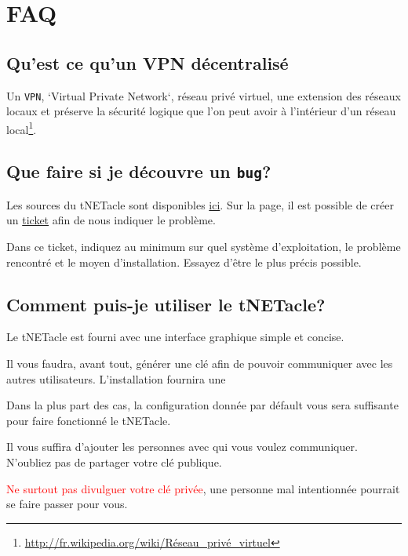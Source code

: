 ﻿\section{FAQ}
\subsection{Qu'est ce qu'un VPN décentralisé}
Un \texttt{VPN}, `Virtual Private Network`, réseau privé virtuel,
une extension des réseaux locaux et préserve la sécurité logique que
l'on peut avoir à l'intérieur d'un réseau local\footnote{\url{http://fr.wikipedia.org/wiki/Réseau\_privé\_virtuel}}.

\subsection{Que faire si je découvre un \texttt{bug}?}

Les sources du tNETacle sont disponibles \href{https://github.com/LaKabane/tNETacle}{ici}.
Sur la page, il est possible de créer un \href{https://github.com/LaKabane/tNETacle/issues/new}{ticket}
afin de nous indiquer le problème.

Dans ce ticket, indiquez au minimum sur quel système d'exploitation, le problème rencontré et le moyen d'installation.
Essayez d'être le plus précis possible.

\subsection{Comment puis-je utiliser le tNETacle?}
Le tNETacle est fourni avec une interface graphique simple et concise.

Il vous faudra, avant tout, générer une clé afin de pouvoir communiquer avec les autres utilisateurs.
L'installation fournira une 

Dans la plus part des cas,
la configuration donnée par défault vous sera suffisante pour faire fonctionné le tNETacle.

Il vous suffira d'ajouter les personnes avec qui vous voulez communiquer. N'oubliez pas de partager votre clé publique.

\textcolor{red}{Ne surtout pas divulguer votre clé privée}, une personne mal intentionnée pourrait se faire passer pour vous.
